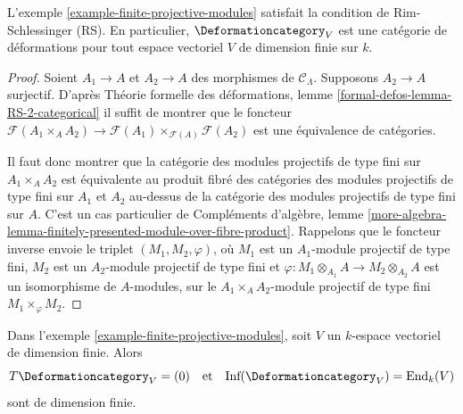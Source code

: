 \begin{lemma}
\label{lemma-finite-projective-modules-RS}
L'exemple \ref{example-finite-projective-modules}
satisfait la condition de Rim-Schlessinger (RS).
En particulier, $\Deformationcategory_V$ est une catégorie de déformations
pour tout espace vectoriel $V$ de dimension finie sur $k$.
\end{lemma}

\begin{proof}
Soient $A_1 \to A$ et $A_2 \to A$ des morphismes de $\mathcal{C}_\Lambda$.
Supposons $A_2 \to A$ surjectif. D'après Théorie formelle
des déformations, lemme
\ref{formal-defos-lemma-RS-2-categorical}
il suffit de montrer que le foncteur
$\mathcal{F}(A_1 \times_A A_2) \to
\mathcal{F}(A_1) \times_{\mathcal{F}(A)} \mathcal{F}(A_2)$
est une équivalence de catégories.

\medskip\noindent
Il faut donc montrer que la catégorie des modules projectifs de type fini
sur $A_1 \times_A A_2$ est équivalente au produit fibré
des catégories des modules projectifs de type fini sur $A_1$ et $A_2$
au-dessus de la catégorie des modules projectifs de type fini sur $A$.
C'est un cas particulier de Compléments d'algèbre, lemme
\ref{more-algebra-lemma-finitely-presented-module-over-fibre-product}.
Rappelons que le foncteur inverse envoie le triplet
$(M_1, M_2, \varphi)$, où
$M_1$ est un $A_1$-module projectif de type fini,
$M_2$ est un $A_2$-module projectif de type fini et
$\varphi : M_1 \otimes_{A_1} A \to M_2 \otimes_{A_2} A$
est un isomorphisme de $A$-modules, sur le $A_1 \times_A A_2$-module
projectif de type fini $M_1 \times_\varphi M_2$.
\end{proof}

\begin{lemma}
\label{lemma-finite-projective-modules-TI}
Dans l'exemple \ref{example-finite-projective-modules},
soit $V$ un $k$-espace vectoriel de dimension finie. Alors
$$
T\Deformationcategory_V = (0)
\quad\text{et}\quad
\text{Inf}(\Deformationcategory_V) = \text{End}_k(V)
$$
sont de dimension finie.
\end{lemma}


